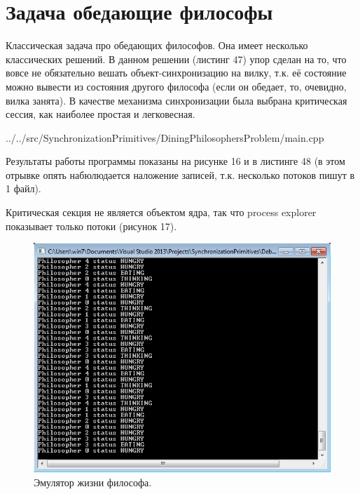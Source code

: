 \documentclass[a4paper, 12pt]{article}		%
\begin{document}
\newpage
\section{Задача обедающие философы}

Классическая задача про обедающих философов. Она имеет несколько классических решений. В данном решении (листинг 47) упор сделан на то, что вовсе не обязательно вешать объект-синхронизацию на вилку, т.к. её состояние можно вывести из состояния другого философа (если он обедает, то, очевидно, вилка занята). В качестве механизма синхронизации была выбрана критическая сессия, как наиболее простая и легковесная.


{../../src/SynchronizationPrimitives/DiningPhilosophersProblem/main.cpp}

Результаты работы программы показаны на рисунке 16 и в листинге 48 (в этом отрывке опять набюлюдается наложение записей, т.к. несколько потоков пишут в 1 файл).

Критическая секция не является объектом ядра, так что process explorer показывает только потоки (рисунок 17).

\newpage

\begin{figure}[h!]
\centering
\includegraphics[scale=1]{res/010}
\caption{Эмулятор жизни философа.}
\end{figure}


\end{document}

